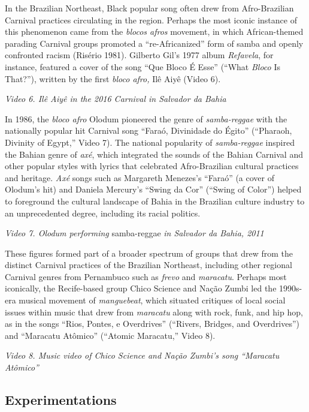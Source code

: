 \documentclass[twoside]{article}
\begin{document}
In the Brazilian Northeast, Black popular song often drew from
Afro-Brazilian Carnival practices circulating in the region. Perhaps the
most iconic instance of this phenomenon came from the \emph{blocos
afros} movement, in which African-themed parading Carnival groups
promoted a ``re-Africanized'' form of samba and openly confronted racism
(Risério 1981). Gilberto Gil's 1977 album \emph{Refavela}, for instance,
featured a cover of the song ``Que Bloco É Esse'' (``What \emph{Bloco}
Is That?''), written by the first \emph{bloco afro,} Ilê Aiyê (Video 6).

\emph{Video 6. Ilê Aiyê in the 2016 Carnival in Salvador da Bahia}

In 1986, the \emph{bloco afro} Olodum pioneered the genre of
\emph{samba-reggae} with the nationally popular hit Carnival song
``Faraó, Divinidade do Égito'' (``Pharaoh, Divinity of Egypt,'' Video
7). The national popularity of \emph{samba-reggae} inspired the Bahian
genre of \emph{axé}, which integrated the sounds of the Bahian Carnival
and other popular styles with lyrics that celebrated Afro-Brazilian
cultural practices and heritage. \emph{Axé} songs such as Margareth
Menezes's ``Faraó'' (a cover of Olodum's hit) and Daniela Mercury's
``Swing da Cor'' (``Swing of Color'') helped to foreground the cultural
landscape of Bahia in the Brazilian culture industry to an unprecedented
degree, including its racial politics.

\emph{Video 7. Olodum performing} samba-reggae \emph{in Salvador da
Bahia, 2011}

These figures formed part of a broader spectrum of groups that drew from
the distinct Carnival practices of the Brazilian Northeast, including
other regional Carnival genres from Pernambuco such as \emph{frevo} and
\emph{maracatu}. Perhaps most iconically, the Recife-based group Chico
Science and Nação Zumbi led the 1990s-era musical movement of
\emph{manguebeat}, which situated critiques of local social issues
within music that drew from \emph{maracatu} along with rock, funk, and
hip hop, as in the songs ``Rios, Pontes, e Overdrives'' (``Rivers,
Bridges, and Overdrives'') and ``Maracatu Atômico'' (``Atomic
Maracatu,'' Video 8).

\emph{Video 8. Music video of Chico Science and Nação Zumbi's song
``Maracatu Atômico''}

\hypertarget{experimentations}{%
\subsection*{Experimentations}\label{experimentations}}
\end{document}
